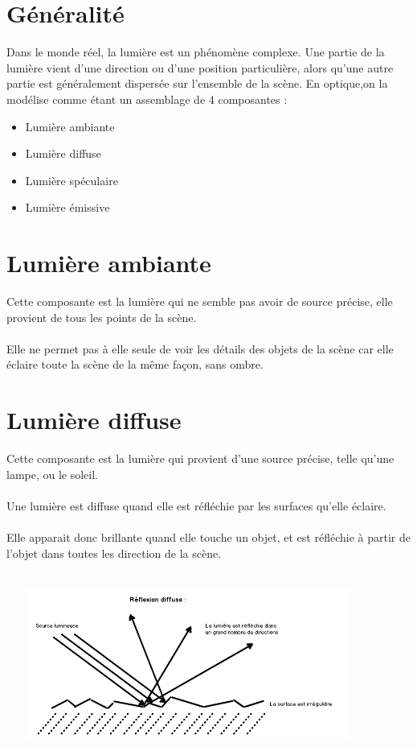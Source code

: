 \section{Généralité}
Dans le monde réel, la lumière est un phénomène complexe.
Une partie de la lumière vient d’une direction ou d’une position particulière, alors
qu’une autre partie est généralement dispersée sur l’ensemble de la scène. En optique,on la modélise comme étant un assemblage de 4 composantes :
\begin{itemize}
\item Lumière ambiante
\item Lumière diffuse
\item Lumière spéculaire
\item Lumière émissive
\end{itemize}

\section{Lumière ambiante}
Cette composante est la lumière qui ne semble pas avoir de source précise, elle provient de tous les points de la scène.
\\\\
Elle ne permet pas à elle seule de voir les détails des objets de la scène car elle éclaire toute la scène de la même façon, sans ombre.

\section{Lumière diffuse}
Cette composante est la lumière qui provient d'une source précise, telle qu'une lampe, ou le soleil.
\\\\
Une lumière est diffuse quand elle est réfléchie par les surfaces qu'elle éclaire.
\\\\
Elle apparait donc brillante quand elle touche un objet, et est réfléchie à partir de l'objet dans toutes les direction de la scène.
\\\\
\begin{center}
\includegraphics[width=12cm,height=5cm]{pipeline/images/reflexion_diffuse.png}
\end{center}


